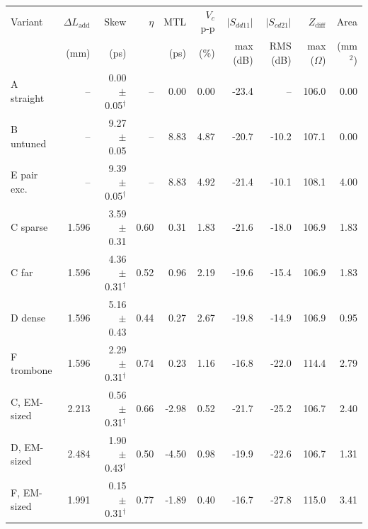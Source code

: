 \begin{tabular}{@{}lrrrrrrrrr@{}}\toprule
Variant & $\Delta L_\mathrm{add}$ & Skew & $\eta$ & MTL & $V_c$ p-p & $|S_{dd11}|$ & $|S_{cd21}|$ & $Z_\mathrm{diff}$ & Area \\
 & (mm) & (ps) & & (ps) & (\%) & max (dB) & RMS (dB) & max ($\Omega$) & (mm$^2$) \\\midrule
A straight & -- & 0.00 $\pm$ 0.05$^\dagger$ & -- & 0.00 & 0.00 & -23.4 & -- & 106.0 & 0.00 \\
B untuned & -- & 9.27 $\pm$ 0.05 & -- & 8.83 & 4.87 & -20.7 & -10.2 & 107.1 & 0.00 \\
E pair exc. & -- & 9.39 $\pm$ 0.05$^\dagger$ & -- & 8.83 & 4.92 & -21.4 & -10.1 & 108.1 & 4.00 \\
C sparse & 1.596 & 3.59 $\pm$ 0.31 & 0.60 & 0.31 & 1.83 & -21.6 & -18.0 & 106.9 & 1.83 \\
C far & 1.596 & 4.36 $\pm$ 0.31$^\dagger$ & 0.52 & 0.96 & 2.19 & -19.6 & -15.4 & 106.9 & 1.83 \\
D dense & 1.596 & 5.16 $\pm$ 0.43 & 0.44 & 0.27 & 2.67 & -19.8 & -14.9 & 106.9 & 0.95 \\
F trombone & 1.596 & 2.29 $\pm$ 0.31$^\dagger$ & 0.74 & 0.23 & 1.16 & -16.8 & -22.0 & 114.4 & 2.79 \\
C, EM-sized & 2.213 & 0.56 $\pm$ 0.31$^\dagger$ & 0.66 & -2.98 & 0.52 & -21.7 & -25.2 & 106.7 & 2.40 \\
D, EM-sized & 2.484 & 1.90 $\pm$ 0.43$^\dagger$ & 0.50 & -4.50 & 0.98 & -19.9 & -22.6 & 106.7 & 1.31 \\
F, EM-sized & 1.991 & 0.15 $\pm$ 0.31$^\dagger$ & 0.77 & -1.89 & 0.40 & -16.7 & -27.8 & 115.0 & 3.41 \\
\bottomrule\end{tabular}
